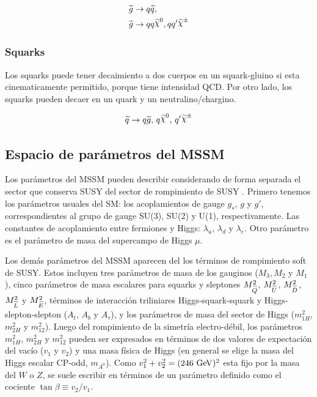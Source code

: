 \begin{align}
  &\gluino \to q\susy{q}, \\ &\gluino \to qq\nino, qq^\prime \chinopm
\end{align}


\subsubsection{Squarks}

Los squarks puede tener decaimiento a dos cuerpos en un squark-gluino
si esta cinematicamente permitido, porque tiene intensidad QCD. Por otro
lado, los squarks pueden decaer en un quark y un neutralino/chargino.

\begin{equation}
  \susy{q} \to q\gluino, \, q\nino, \, q^\prime \chinopm
\end{equation}



\subsection{Espacio de parámetros del MSSM}

Los parámetros del MSSM pueden describir considerando de forma
separada el sector que conserva SUSY del sector de rompimiento de SUSY
\cite{PDG,Haber:1993wf}. Primero tenemos los parámetros usuales del
SM: los acoplamientos de gauge $g_s$, $g$ y $g'$, correspondientes al
grupo de gauge SU(3), SU(2) y U(1), respectivamente. Las constantes de
acoplamiento entre fermiones y Higgs: $\lambda_u$, $\lambda_d$ y
$\lambda_e$. %
Otro parámetro es el parámetro de masa del supercampo de Higgs $\mu$.

Los demás parámetros del MSSM aparecen del los términos de rompimiento
soft de SUSY. Estos incluyen tres parámetros de masa de los gauginos
($M_3, M_2$ y $M_1$), cinco parámetros de masa escalares para squarks
y sleptones $M^2_{\widetilde{Q}}$, $M^2_{\widetilde{U}}$, $M^2_{\widetilde{D}}$,
$M^2_{\widetilde{L}}$ y $M^2_{\widetilde{E}}$, términos de interacción
triliniares Higgs-squark-squark y Higgs-slepton-slepton ($A_t$, $A_b$
y $A_\tau$), y los parámetros de masa del sector de Higgs ($m^2_{1H}$,
$m^2_{2H}$ y $m^2_{12}$). Luego del rompimiento de la simetría
electro-débil, los parámetros $m^2_{1H}$, $m^2_{2H}$ y $m^2_{12}$
pueden ser expresados en términos de dos valores de expectación del
vacío ($v_1$ y $v_2$) y una masa física de Higgs (en general se elige
la masa del Higgs escalar CP-odd, $m_{A^0}$). Como $v_1^2+v_2^2=(246
\gev)^2$ esta fijo por la masa del $W$ o $Z$, se suele escribir en
términos de un parámetro definido como el cociente $\tan \beta \equiv
v_2/v_1$.

